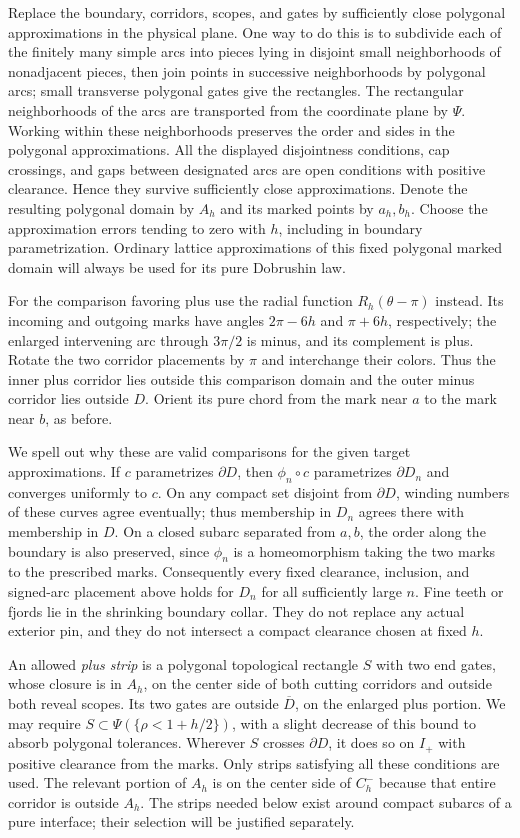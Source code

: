Replace the boundary, corridors, scopes, and gates by sufficiently close
polygonal approximations in the physical plane.  One way to do this is
to subdivide each of the finitely many simple arcs into pieces lying in
disjoint small neighborhoods of nonadjacent pieces, then join points in
successive neighborhoods by polygonal arcs; small transverse polygonal
gates give the rectangles. The rectangular neighborhoods of the arcs
are transported from the coordinate plane by $\Psi$. Working within
these neighborhoods preserves the order and sides in the polygonal
approximations.  All the displayed disjointness conditions, cap
crossings, and gaps between designated arcs are open conditions with
positive clearance.  Hence they survive sufficiently close
approximations.  Denote the resulting polygonal domain by $A_h$ and its
marked points by $a_h,b_h$.  Choose the approximation errors tending to
zero with $h$, including in boundary parametrization.  Ordinary lattice
approximations of this fixed polygonal marked domain will always be used
for its pure Dobrushin law.

For the comparison favoring plus use the radial function
$R_h(\theta-\pi)$ instead.  Its incoming and outgoing marks have angles
$2\pi-6h$ and $\pi+6h$, respectively; the enlarged intervening arc
through $3\pi/2$ is minus, and its complement is plus.  Rotate the two
corridor placements by $\pi$ and interchange their colors.  Thus the
inner plus corridor lies outside this comparison domain and the outer
minus corridor lies outside $D$.  Orient its pure chord from the mark
near $a$ to the mark near $b$, as before.

We spell out why these are valid comparisons for the given target
approximations.  If $c$ parametrizes $\partial D$, then $\phi_n\circ c$
parametrizes $\partial D_n$ and converges uniformly to $c$.  On any compact
set disjoint from $\partial D$, winding numbers of these curves agree
eventually; thus membership in $D_n$ agrees there with membership in $D$.
On a closed subarc separated from $a,b$, the order along the boundary is
also preserved, since $\phi_n$ is a homeomorphism taking the two marks to
the prescribed marks.  Consequently every fixed clearance, inclusion,
and signed-arc placement above holds for $D_n$ for all sufficiently large
$n$.  Fine teeth or fjords lie in the shrinking boundary collar.  They do
not replace any actual exterior pin, and they do not intersect a compact
clearance chosen at fixed $h$.

An allowed \emph{plus strip} is a polygonal topological rectangle $S$
with two end gates, whose closure is in $A_h$, on the center side of both
cutting corridors and outside both reveal scopes.  Its two gates are
outside $\overline D$, on the enlarged plus portion.  We may require
$S\subset\Psi(\{\rho<1+h/2\})$, with a slight decrease of this bound
to absorb polygonal tolerances.  Wherever $S$ crosses $\partial D$, it
does so on $I_+$ with positive clearance from the marks.  Only strips
satisfying all these conditions are used.  The relevant portion of $A_h$
is on the center side of $C_h^-$ because that entire corridor is outside
$A_h$.  The strips needed below exist around compact subarcs of a pure
interface; their selection will be justified separately.


